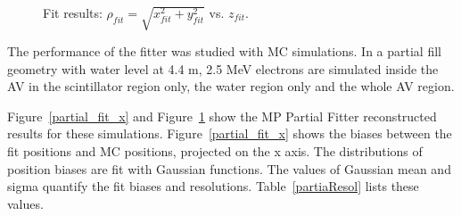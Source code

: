 \begin{figure}[htbp]
{\begin{minipage}[t]{0.38\textwidth}
		\end{minipage}
	}
	\caption{Fit results: $\rho_{fit}=\sqrt{x_{fit}^2+y_{fit}^2}$ vs. $z_{fit}$.}
	\label{partial_fit_rz}
\end{figure}

The performance of the fitter was studied with MC simulations. In a partial fill geometry with water level at 4.4 m, 2.5 MeV electrons are simulated inside the AV in the scintillator region only, the water region only and the whole AV region.

Figure~\ref{partial_fit_x} and Figure~\ref{partial_fit_rz} show the MP Partial Fitter reconstructed results for these simulations. Figure~\ref{partial_fit_x} shows the biases between the fit positions and MC positions, projected on the x axis. The distributions of position biases are fit with Gaussian functions. The values of Gaussian mean and sigma quantify the fit biases and resolutions. Table~\ref{partiaResol} lists these values.

